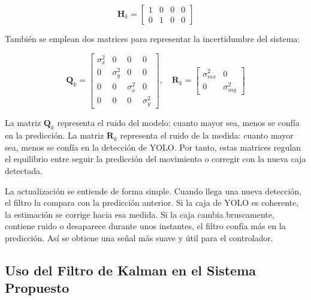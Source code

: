 \begin{equation}
\mathbf{H}_k = \left[ \begin{array}{cccc}
1 & 0 & 0 & 0 \\
0 & 1 & 0 & 0
\end{array} \right]
\end{equation}

\vspace{0.3cm}

También se emplean dos matrices para representar la incertidumbre del sistema:

\begin{equation}
\mathbf{Q}_k = \left[ \begin{array}{cccc}
\sigma_x^2 & 0 & 0 & 0 \\
0 & \sigma_y^2 & 0 & 0 \\
0 & 0 & \sigma_{\dot{x}}^2 & 0 \\
0 & 0 & 0 & \sigma_{\dot{y}}^2
\end{array} \right], \quad
\mathbf{R}_k = \left[ \begin{array}{cc}
\sigma_{mx}^2 & 0 \\
0 & \sigma_{my}^2
\end{array} \right]
\end{equation}

\vspace{0.3cm}

La matriz $\mathbf{Q}_k$ representa el ruido del modelo: cuanto mayor sea, menos se confía en la predicción. La matriz $\mathbf{R}_k$ representa el ruido de la medida: cuanto mayor sea, menos se confía en la detección de YOLO. Por tanto, estas matrices regulan el equilibrio entre seguir la predicción del movimiento o corregir con la nueva caja detectada.

\vspace{0.3cm}

La actualización se entiende de forma simple. Cuando llega una nueva detección, el filtro la compara con la predicción anterior. Si la caja de YOLO es coherente, la estimación se corrige hacia esa medida. Si la caja cambia bruscamente, contiene ruido o desaparece durante unos instantes, el filtro confía más en la predicción. Así se obtiene una señal más suave y útil para el controlador.

\subsection{Uso del Filtro de Kalman en el Sistema Propuesto}

